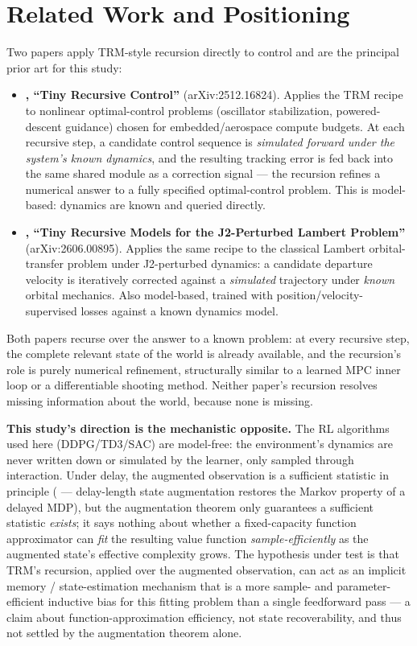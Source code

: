 \documentclass[11pt]{article}
\begin{document}
\section{Related Work and Positioning}
\label{sec:related}

Two papers apply TRM-style recursion directly to control and are the principal prior art for this study:

\begin{itemize}
  \item \textbf{\citet{jainlinares2025trc}, ``Tiny Recursive Control''} (arXiv:2512.16824). Applies the TRM recipe to nonlinear optimal-control problems (oscillator stabilization, powered-descent guidance) chosen for embedded/aerospace compute budgets. At each recursive step, a candidate control sequence is \emph{simulated forward under the system's known dynamics}, and the resulting tracking error is fed back into the same shared module as a correction signal --- the recursion refines a numerical answer to a fully specified optimal-control problem. This is model-based: dynamics are known and queried directly.
  \item \textbf{\citet{wijayatunga2026trmpl}, ``Tiny Recursive Models for the J2-Perturbed Lambert Problem''} (arXiv:2606.00895). Applies the same recipe to the classical Lambert orbital-transfer problem under J2-perturbed dynamics: a candidate departure velocity is iteratively corrected against a \emph{simulated} trajectory under \emph{known} orbital mechanics. Also model-based, trained with position/velocity-supervised losses against a known dynamics model.
\end{itemize}

Both papers recurse over the answer to a known problem: at every recursive step, the complete relevant state of the world is already available, and the recursion's role is purely numerical refinement, structurally similar to a learned MPC inner loop or a differentiable shooting method. Neither paper's recursion resolves missing information about the world, because none is missing.

\textbf{This study's direction is the mechanistic opposite.} The RL algorithms used here (DDPG/TD3/SAC) are model-free: the environment's dynamics are never written down or simulated by the learner, only sampled through interaction. Under delay, the augmented observation is a sufficient statistic in principle (\citealp{katsikopoulos2003delayed} --- delay-length state augmentation restores the Markov property of a delayed MDP), but the augmentation theorem only guarantees a sufficient statistic \emph{exists}; it says nothing about whether a fixed-capacity function approximator can \emph{fit} the resulting value function \emph{sample-efficiently} as the augmented state's effective complexity grows. The hypothesis under test is that TRM's recursion, applied over the augmented observation, can act as an implicit memory / state-estimation mechanism that is a more sample- and parameter-efficient inductive bias for this fitting problem than a single feedforward pass --- a claim about function-approximation efficiency, not state recoverability, and thus not settled by the augmentation theorem alone.
\end{document}
